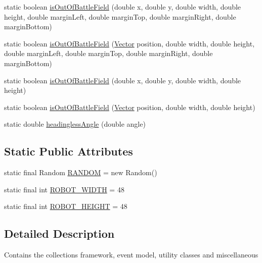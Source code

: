 \begin{DoxyCompactItemize}
\item 
static boolean \hyperlink{classmega_1_1boirlerplate_1_1_util_ac2047924cc697d5f4a3a70a5951b5173}{is\+Out\+Of\+Battle\+Field} (double x, double y, double width, double height, double margin\+Left, double margin\+Top, double margin\+Right, double margin\+Bottom)
\item 
static boolean \hyperlink{classmega_1_1boirlerplate_1_1_util_aadc05c7a6a9a8ba4fb66080846fa41f3}{is\+Out\+Of\+Battle\+Field} (\hyperlink{classmega_1_1boirlerplate_1_1_vector}{Vector} position, double width, double height, double margin\+Left, double margin\+Top, double margin\+Right, double margin\+Bottom)
\item 
static boolean \hyperlink{classmega_1_1boirlerplate_1_1_util_a4f558cc6aaefd091e819e4a5edb22e38}{is\+Out\+Of\+Battle\+Field} (double x, double y, double width, double height)
\item 
static boolean \hyperlink{classmega_1_1boirlerplate_1_1_util_a75b259563829a3f2351f6d0e25c3a59b}{is\+Out\+Of\+Battle\+Field} (\hyperlink{classmega_1_1boirlerplate_1_1_vector}{Vector} position, double width, double height)
\item 
static double \hyperlink{classmega_1_1boirlerplate_1_1_util_ade61761e2023c7defc758e8aaaf15e06}{headingless\+Angle} (double angle)
\end{DoxyCompactItemize}
\subsection*{Static Public Attributes}
\begin{DoxyCompactItemize}
\item 
static final Random \hyperlink{classmega_1_1boirlerplate_1_1_util_a73e0b59edb9b6d335b2407aaa7989d39}{R\+A\+N\+D\+OM} = new Random()
\item 
static final int \hyperlink{classmega_1_1boirlerplate_1_1_util_aa71f5f5fffc472da7ab047be834ae531}{R\+O\+B\+O\+T\+\_\+\+W\+I\+D\+TH} = 48
\item 
static final int \hyperlink{classmega_1_1boirlerplate_1_1_util_ad8d3444f57297eec764c0aabf42c6c85}{R\+O\+B\+O\+T\+\_\+\+H\+E\+I\+G\+HT} = 48
\end{DoxyCompactItemize}


\subsection{Detailed Description}
Contains the collections framework, event model, utility classes and miscellaneous

